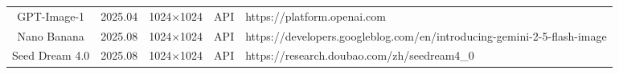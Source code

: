 \documentclass{article}
\begin{document}
\begin{table}[t]
{\begin{tabular}{cc|ccl}
        \multicolumn{1}{c|}{GPT-Image-1} & 2025.04 & \multicolumn{1}{c|}{1024$\times$1024} & \multicolumn{1}{c|}{API} &  https://platform.openai.com \\ 
        \multicolumn{1}{c|}{{Nano Banana}} & {2025.08} & \multicolumn{1}{c|}{{1024$\times$1024}} & \multicolumn{1}{c|}{{API}} &  {https://developers.googleblog.com/en/introducing-gemini-2-5-flash-image} \\ 
        \multicolumn{1}{c|}{{Seed Dream 4.0}} & {2025.08} & \multicolumn{1}{c|}{{1024$\times$1024}} & \multicolumn{1}{c|}{{API}} &  {https://research.doubao.com/zh/seedream4\_0} \\ 
        \hline
        \end{tabular}
    }

    \label{tab:model_source}
    \vspace{-0.3cm}
\end{table}
\end{document}
